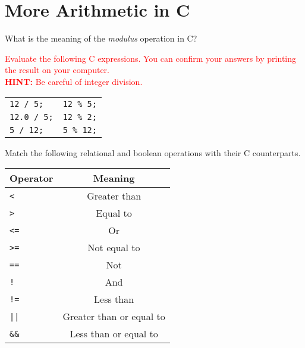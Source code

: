 \documentclass{pass}
\begin{document}
\section*{More Arithmetic in C}
\begin{enumerate}[resume]
\item What is the meaning of the \textit{modulus} operation in C?

\textcolor{red}{\item Evaluate the following C expressions. You can confirm your answers by printing the result on your computer. \\
\textbf{HINT:} Be careful of integer division.
	\begin{enumerate}
	    \begin{tabularx}{\textwidth}{XX}
	    \item \texttt{12 / 5;} &
	    \item \texttt{12 \% 5;} \\
	    \item \texttt{12.0 / 5;} &
	    \item \texttt{12 \% 2;} \\
	    \item \texttt{5 / 12;} &
	    \item \texttt{5 \% 12;} \\
	    \end{tabularx}
	\end{enumerate}
}

\item Match the following relational and boolean operations with their C counterparts.
	\begin{center}
	\begin{tabular}{|l|c|} \hline
	\textbf{Operator} & \textbf{Meaning} \\ \hline
	\texttt{<} & Greater than \\
	\texttt{>} & Equal to \\
	\texttt{<=} & Or \\
	\texttt{>=} & Not equal to \\
	\texttt{==} & Not \\
	\texttt{!} & And \\
	\texttt{!=} & Less than \\
	\texttt{||} & Greater than or equal to \\
	\texttt{\&\&} & Less than or equal to \\ \hline
	\end{tabular}
	\end{center}


\end{enumerate}
\end{document}

